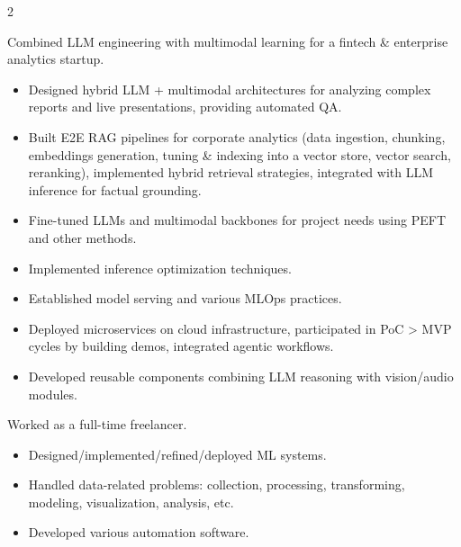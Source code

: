 \documentclass[10pt,a4paper,withhyper,normalphoto]{altacv}
\begin{document}

\makecvheader
{}
\begin{paracol}{2}

Combined LLM engineering with multimodal learning for a fintech \& enterprise analytics startup.
\medskip
\begin{itemize}
\item Designed hybrid LLM + multimodal architectures for analyzing complex reports and live presentations, providing automated QA.
\item Built E2E RAG pipelines for corporate analytics (data ingestion, chunking, embeddings generation, tuning \& indexing into a vector store, vector search, reranking), implemented hybrid retrieval strategies, integrated with LLM inference for factual grounding.
\item Fine-tuned LLMs and multimodal backbones for project needs using PEFT and other methods.
\item Implemented inference optimization techniques.
\item Established model serving and various MLOps practices.
\item Deployed microservices on cloud infrastructure, participated in PoC > MVP cycles by building demos, integrated agentic workflows.
\item Developed reusable components combining LLM reasoning with vision/audio modules.
\end{itemize}
\divider
{}
Worked as a full-time freelancer.
\medskip
\begin{itemize}
\item Designed/implemented/refined/deployed ML systems.
\item Handled data-related problems: collection, processing, transforming, modeling, visualization, analysis, etc.
\item Developed various automation software.
\end{itemize}
\divider
{}

\end{paracol}
\end{document}
